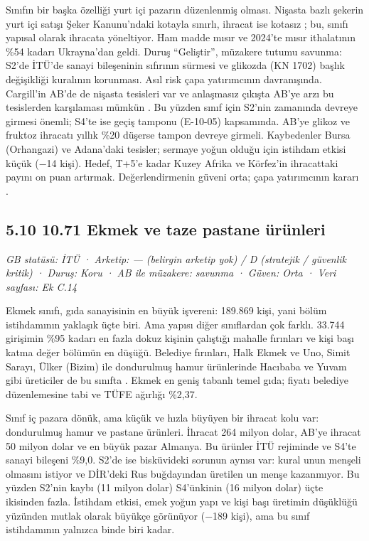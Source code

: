 Sınıfın bir başka özelliği yurt içi pazarın düzenlenmiş olması. Nişasta bazlı şekerin yurt içi satışı Şeker Kanunu'ndaki kotayla sınırlı, ihracat ise kotasız \etiketV{}; bu, sınıfı yapısal olarak ihracata yöneltiyor. Ham madde mısır ve 2024'te mısır ithalatının \%54 kadarı Ukrayna'dan geldi. Duruş ``Geliştir'', müzakere tutumu savunma: S2'de İTÜ'de sanayi bileşeninin sıfırının sürmesi ve glikozda (KN 1702) başlık değişikliği kuralının korunması. Asıl risk çapa yatırımcının davranışında. Cargill'in AB'de de nişasta tesisleri var ve anlaşmasız çıkışta AB'ye arzı bu tesislerden karşılaması mümkün \etiketH{}. Bu yüzden sınıf için S2'nin zamanında devreye girmesi önemli; S4'te ise geçiş tamponu (E-10-05) kapsamında. AB'ye glikoz ve fruktoz ihracatı yıllık \%20 düşerse tampon devreye girmeli. Kaybedenler Bursa (Orhangazi) ve Adana'daki tesisler; sermaye yoğun olduğu için istihdam etkisi küçük (−14 kişi). Hedef, T+5'e kadar Kuzey Afrika ve Körfez'in ihracattaki payını on puan artırmak. Değerlendirmenin güveni orta; çapa yatırımcının kararı \etiketH{}.

\hypertarget{nace_kartlar_10-12-510-1071-ekmek-ve-taze-pastane-uxfcruxfcnleri}{%
\subsection{5.10 10.71 Ekmek ve taze pastane ürünleri}\label{nace_kartlar_10-12-510-1071-ekmek-ve-taze-pastane-uxfcruxfcnleri}}

\emph{GB statüsü: İTÜ · Arketip: --- (belirgin arketip yok) / D (stratejik / güvenlik kritik) · Duruş: Koru · AB ile müzakere: savunma · Güven: Orta · Veri sayfası: Ek C.14}

Ekmek sınıfı, gıda sanayisinin en büyük işvereni: 189.869 kişi, yani bölüm istihdamının yaklaşık üçte biri. Ama yapısı diğer sınıflardan çok farklı. 33.744 girişimin \%95 kadarı en fazla dokuz kişinin çalıştığı mahalle fırınları ve kişi başı katma değer bölümün en düşüğü. Belediye fırınları, Halk Ekmek ve Uno, Simit Sarayı, Ülker (Bizim) ile dondurulmuş hamur ürünlerinde Hacıbaba ve Yuvam gibi üreticiler de bu sınıfta \etiketH{}. Ekmek en geniş tabanlı temel gıda; fiyatı belediye düzenlemesine tabi ve TÜFE ağırlığı \%2,37.

Sınıf iç pazara dönük, ama küçük ve hızla büyüyen bir ihracat kolu var: dondurulmuş hamur ve pastane ürünleri. İhracat 264 milyon dolar, AB'ye ihracat 50 milyon dolar ve en büyük pazar Almanya. Bu ürünler İTÜ rejiminde ve S4'te sanayi bileşeni \%9,0. S2'de ise bisküvideki sorunun aynısı var: kural unun menşeli olmasını istiyor ve DİR'deki Rus buğdayından üretilen un menşe kazanmıyor. Bu yüzden S2'nin kaybı (11 milyon dolar) S4'ünkinin (16 milyon dolar) üçte ikisinden fazla. İstihdam etkisi, emek yoğun yapı ve kişi başı üretimin düşüklüğü yüzünden mutlak olarak büyükçe görünüyor (−189 kişi), ama bu sınıf istihdamının yalnızca binde biri kadar.

